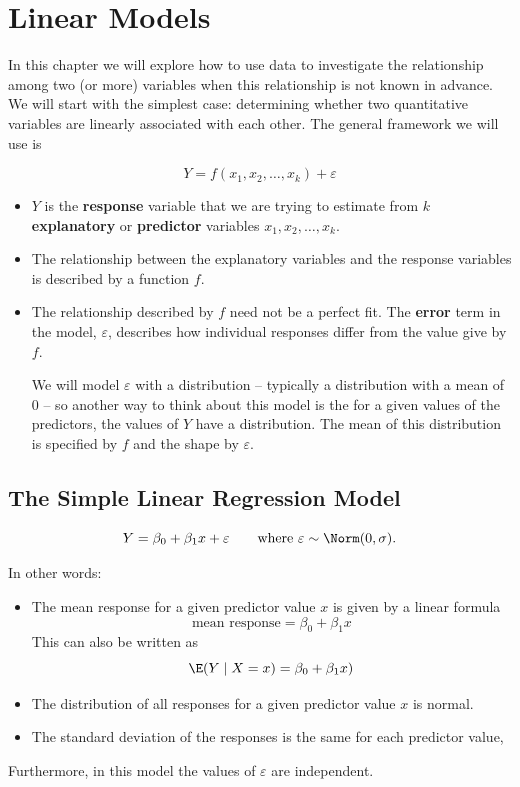 \documentclass[twoside]{book}\usepackage[]{graphicx}\usepackage[]{xcolor}
\def\term#1{\textbf{#1}}
\begin{document}
 



\chapter{Linear Models}

In this chapter we will explore how to use data to investigate the relationship among
two (or more) variables when this relationship is not known in advance.  We will start with the simplest case:  determining whether two quantitative variables are linearly associated with each other. The general
framework we will use is 

\[
Y = f(x_1, x_2, \dots, x_k) + \varepsilon
\]
\begin{itemize}
	\item $Y$ is the \term{response} variable that we are trying to estimate
		from $k$ \term{explanatory} or \term{predictor} variables $x_1, x_2, \dots, x_k$.
	\item
		The relationship between the explanatory variables and the response 
		variables is described by a function $f$.
	\item
		The relationship described by $f$ need not be a perfect fit.  The \term{error}
		term in the model, $\varepsilon$, describes how individual responses
		differ from the value give by $f$.  
		
		We will model $\varepsilon$ with a 
		distribution -- typically a distribution with a mean of 0 -- 
		so another way to think about this model is the for a given 
		values of the predictors, the values of $Y$ have a distribution.  The mean
		of this distribution is specified by $f$ and the shape by $\varepsilon$.
\end{itemize}


\section{The Simple Linear Regression Model}

\[
Y = \beta_0 + \beta_1 x + \varepsilon  \qquad \mbox{where $\varepsilon \sim \Norm(0,\sigma)$.}
\]

In other words:
\begin{itemize}
\item
The mean response for a given predictor value $x$ is given by a linear formula
\[
\mbox{mean response} = \beta_0 + \beta_1 x
\]
This can also be written as 
\[
\E(Y \mid X=x) = \beta_0 + \beta_1 x)
\]
\item
The distribution of all responses for a given predictor value $x$ is normal.
\item
The standard deviation of the responses is the same for each predictor value,
\end{itemize}
Furthermore, in this model the values of $\varepsilon$ are independent.
\end{document}
